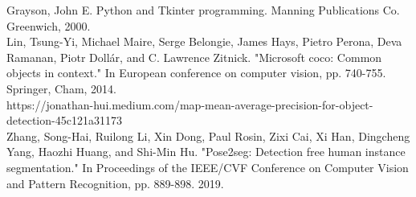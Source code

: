 \begin{thebibliography}{9}
Grayson, John E. Python and Tkinter programming. Manning Publications Co. Greenwich, 2000.\\

Lin, Tsung-Yi, Michael Maire, Serge Belongie, James Hays, Pietro Perona, Deva Ramanan, Piotr Dollár, and C. Lawrence Zitnick. "Microsoft coco: Common objects in context." In European conference on computer vision, pp. 740-755. Springer, Cham, 2014.\\

https://jonathan-hui.medium.com/map-mean-average-precision-for-object-detection-45c121a31173\\

Zhang, Song-Hai, Ruilong Li, Xin Dong, Paul Rosin, Zixi Cai, Xi Han, Dingcheng Yang, Haozhi Huang, and Shi-Min Hu. "Pose2seg: Detection free human instance segmentation." In Proceedings of the IEEE/CVF Conference on Computer Vision and Pattern Recognition, pp. 889-898. 2019.\\

\end{thebibliography}

